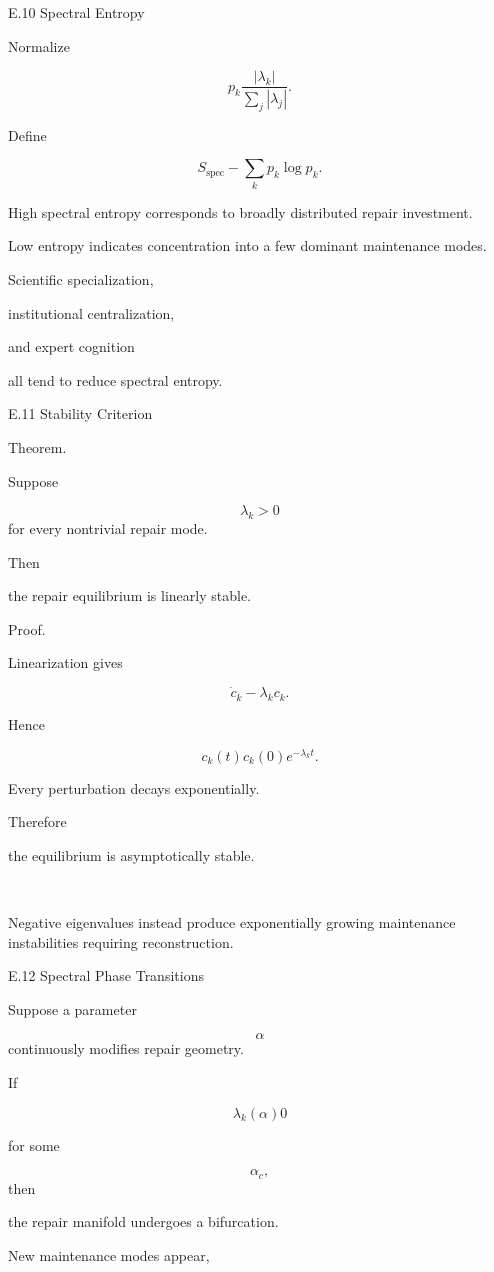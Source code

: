 \documentclass[12pt,oneside]{article}
\theoremstyle{plain}
\theoremstyle{definition}
\theoremstyle{remark}
\begin{document}
E.10 Spectral Entropy

Normalize

\[
p_k
\frac{
|\lambda_k|
}
{
\sum_j
|\lambda_j|
}.
\]

Define

\[
S_{\mathrm{spec}}
- 

\sum_k
p_k
\log p_k.
\]

High spectral entropy corresponds to broadly distributed repair investment.

Low entropy indicates concentration into a few dominant maintenance modes.

Scientific specialization,

institutional centralization,

and expert cognition

all tend to reduce spectral entropy.


E.11 Stability Criterion

Theorem.

Suppose

\[
\lambda_k>0
\]
for every nontrivial repair mode.

Then

the repair equilibrium is linearly stable.

Proof.

Linearization gives

\[
\dot c_k
- 

\lambda_kc_k.
\]

Hence

\[
c_k(t)
c_k(0)
e^{-\lambda_kt}.
\]

Every perturbation decays exponentially.

Therefore

the equilibrium is asymptotically stable.

\square

Negative eigenvalues instead produce exponentially growing maintenance instabilities requiring reconstruction.


E.12 Spectral Phase Transitions

Suppose a parameter

\[
\alpha
\]
continuously modifies repair geometry.

If

\[
\lambda_k(\alpha)
0
\]

for some

\[
\alpha_c,
\]
then

the repair manifold undergoes a bifurcation.

New maintenance modes appear,
\end{document}
